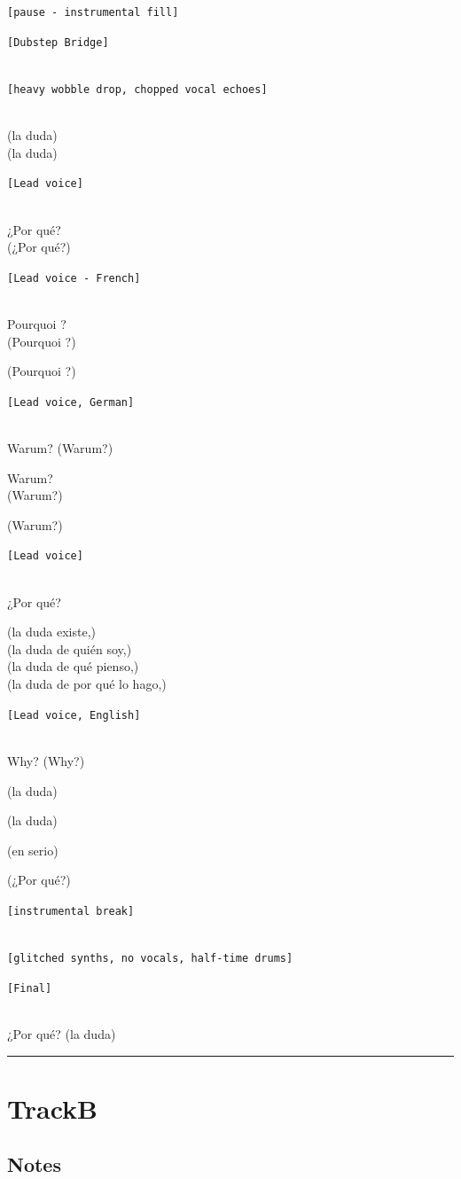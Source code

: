 \texttt{{[}pause\ -\ instrumental\ fill{]}}

\texttt{{[}Dubstep\ Bridge{]}}\strut \\
\texttt{{[}heavy\ wobble\ drop,\ chopped\ vocal\ echoes{]}}\strut \\
(la duda)\\
(la duda)

\texttt{{[}Lead\ voice{]}}\strut \\
¿Por qué?\\
(¿Por qué?)

\texttt{{[}Lead\ voice\ -\ French{]}}\strut \\
Pourquoi ?\\
(Pourquoi ?)

(Pourquoi ?)

\texttt{{[}Lead\ voice,\ German{]}}\strut \\
Warum? (Warum?)

Warum?\\
(Warum?)

(Warum?)

\texttt{{[}Lead\ voice{]}}\strut \\
¿Por qué?

(la duda existe,)\\
(la duda de quién soy,)\\
(la duda de qué pienso,)\\
(la duda de por qué lo hago,)

\texttt{{[}Lead\ voice,\ English{]}}\strut \\
Why? (Why?)

(la duda)

(la duda)

(en serio)

(¿Por qué?)

\texttt{{[}instrumental\ break{]}}\strut \\
\texttt{{[}glitched\ synths,\ no\ vocals,\ half-time\ drums{]}}

\texttt{{[}Final{]}}\strut \\
¿Por qué? (la duda)

\begin{center}\rule{0.5\linewidth}{0.5pt}\end{center}

\section{TrackB}\label{trackb}

\subsection{Notes}\label{notes-30}

